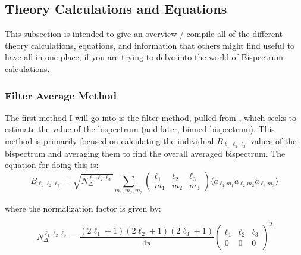 \documentclass[11pt]{article}
\renewcommand{\_}[1]{\underline{ #1 }}
\begin{document}
{\subsection{Theory Calculations and Equations}\label{theory}

This subsection is intended to give an overview / compile all of the different theory calculations, equations, and information that others might find useful to have all in one place, if you are trying to delve into the world of Bispectrum calculations.

\subsubsection{Filter Average Method}\label{averagemethod}

The first method I will go into is the filter method, pulled from \cite{Bucher_2016}, which seeks to estimate the value of the bispectrum (and later, binned bispectrum). This method is primarily focused on calculating the individual $B_{\ell_1 \ell_2 \ell_3}$ values of the bispectrum and averaging them to find the overall averaged bispectrum. The equation for doing this is:
\begin{equation}
    B_{\ell_1\ell_2\ell_3} = \sqrt{N_{\Delta}^{\ell_1\ell_2\ell_3}} \sum_{m_1,m_2,m_3}
    \begin{pmatrix}
        \ell_1 & \ell_2 & \ell_3 \\
        m_1 & m_2 & m_3
    \end{pmatrix}
    \langle a_{\ell_1 m_1} a_{\ell_2 m_2} a_{\ell_3 m_3} \rangle
\end{equation}

where the normalization factor is given by:

\begin{equation}
N_{\Delta}^{\ell_1\ell_2\ell_3} = \frac{(2\ell_1+1)(2\ell_2+1)(2\ell_3+1)}{4\pi}
    \begin{pmatrix}
        \ell_1 & \ell_2 & \ell_3 \\
        0 & 0 & 0
    \end{pmatrix}^2
\end{equation}

}
\end{document}
